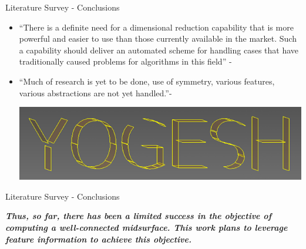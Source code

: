 \begin{frame}[<+-| alert@+>]{Literature Survey - Conclusions}
\begin{itemize}[noitemsep,label=\textbullet,topsep=2pt,parsep=2pt,partopsep=2pt]

\item ``There is a definite need for a dimensional reduction capability that is more powerful and easier to use than those currently available in the market. Such a capability should deliver an automated scheme for handling cases that have traditionally caused problems for algorithms in this field'' - \cite{Stanley2010}

\item ``Much of research is yet to be done, use of symmetry, various features, various abstractions are not yet handled.''- \cite{Smit2011}

\vspace{1cm}

\includegraphics[scale=0.4]{../Common/images/YOGESH_Midsurf.png}

\end{itemize}


\end{frame}

\begin{frame}[<+-| alert@+>]{Literature Survey - Conclusions}

\centering
{\em \bfseries \large Thus, so far, there has been a limited success in the objective of computing a well-connected midsurface. This work plans to leverage feature information to achieve this objective.}



\end{frame}
